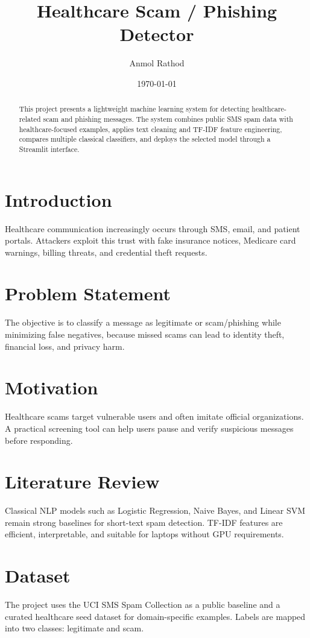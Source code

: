 \documentclass[12pt]{article}
\title{Healthcare Scam / Phishing Detector}
\author{Anmol Rathod}
\date{\today}
\begin{document}
\maketitle

\begin{abstract}
This project presents a lightweight machine learning system for detecting healthcare-related scam and phishing messages. The system combines public SMS spam data with healthcare-focused examples, applies text cleaning and TF-IDF feature engineering, compares multiple classical classifiers, and deploys the selected model through a Streamlit interface.
\end{abstract}

\section{Introduction}
Healthcare communication increasingly occurs through SMS, email, and patient portals. Attackers exploit this trust with fake insurance notices, Medicare card warnings, billing threats, and credential theft requests.

\section{Problem Statement}
The objective is to classify a message as legitimate or scam/phishing while minimizing false negatives, because missed scams can lead to identity theft, financial loss, and privacy harm.

\section{Motivation}
Healthcare scams target vulnerable users and often imitate official organizations. A practical screening tool can help users pause and verify suspicious messages before responding.

\section{Literature Review}
Classical NLP models such as Logistic Regression, Naive Bayes, and Linear SVM remain strong baselines for short-text spam detection. TF-IDF features are efficient, interpretable, and suitable for laptops without GPU requirements.

\section{Dataset}
The project uses the UCI SMS Spam Collection as a public baseline and a curated healthcare seed dataset for domain-specific examples. Labels are mapped into two classes: legitimate and scam.
\end{document}

